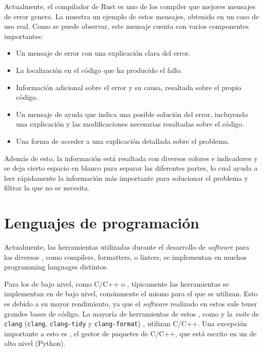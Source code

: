 
Actualmente, el compilador de Rust \parencite{Rust} es uno de los
compiler que mejores mensajes de error genera. La 
muestra un ejemplo de estos mensajes, obtenido en un caso de uso real. Como se
puede observar, este mensaje cuenta con varios componentes importantes:

\begin{itemize}
    \item Un mensaje de error con una explicación clara del error.
    \item La localización en el código que ha producido el fallo.
    \item Información adicional sobre el error y su causa, resaltada sobre el
    propio código.
    \item Un mensaje de ayuda que indica una posible solución del error,
    incluyendo una explicación y las modificaciones necesarias resaltadas sobre
    el código.
    \item Una forma de acceder a una explicación detallada sobre el problema.
\end{itemize}

Además de esto, la información está resaltada con diversos colores e indicadores
y se deja cierto espacio en blanco para separar las diferentes partes, lo cual
ayuda a leer rápidamente la información más importante para solucionar el
problema y filtrar la que no se necesita.


\FloatBarrier

\section{Lenguajes de programación}\label{sec:programming-languages}

Actualmente, las herramientas utilizadas durante el desarrollo de
\textit{software} para los diversos ,
como \glspl{compiler}, \glspl{formatter}, o \glspl{linter}, se implementan en
muchos \glspl{programming language} distintos.

Para los  de bajo nivel, como C/C++ o
, típicamente las herramientas se implementan en
 de bajo nivel, comúnmente el mismo
para el que se utilizan. Esto es debido a su mayor rendimiento, ya que el
\textit{software} realizado en estos 
sule tener grandes bases de código. La mayoría de herramientas de estos
, como  y la
\textit{suite} de \verb!clang! (\verb!clang!, \verb!clang-tidy! y
\verb!clang-format!) \parencite{clang}, utilizan C/C++. Una excepción importante
a esto es , el gestor de paquetes de C/C++, que está escrito en
un  de alto nivel (Python).

